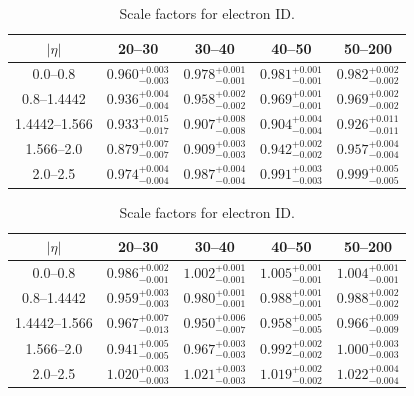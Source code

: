 \begin{table}[h]
\centering
{}
\begin{center}
    \begin{tabular}{@{}c c c c c@{}}
    \toprule
	$|\eta|$                 & 20--30 \GeV               & 30--40 \GeV               & 40--50 \GeV               & 50--200 \GeV \\
    \midrule
	\numrange{0.0}{0.8}      & $0.960_{-0.003}^{+0.003}$ & $0.978_{-0.001}^{+0.001}$ & $0.981_{-0.001}^{+0.001}$ & $0.982_{-0.002}^{+0.002}$ \\
	\numrange{0.8}{1.4442}   & $0.936_{-0.004}^{+0.004}$ & $0.958_{-0.002}^{+0.002}$ & $0.969_{-0.001}^{+0.001}$ & $0.969_{-0.002}^{+0.002}$ \\
	\numrange{1.4442}{1.566} & $0.933_{-0.017}^{+0.015}$ & $0.907_{-0.008}^{+0.008}$ & $0.904_{-0.004}^{+0.004}$ & $0.926_{-0.011}^{+0.011}$ \\
	\numrange{1.566}{2.0}    & $0.879_{-0.007}^{+0.007}$ & $0.909_{-0.003}^{+0.003}$ & $0.942_{-0.002}^{+0.002}$ & $0.957_{-0.004}^{+0.004}$ \\
	\numrange{2.0}{2.5}      & $0.974_{-0.004}^{+0.004}$ & $0.987_{-0.004}^{+0.004}$ & $0.991_{-0.003}^{+0.003}$ & $0.999_{-0.005}^{+0.005}$ \\
    \bottomrule
    \end{tabular}
\end{center}
\caption{
    Scale factors for \EGTIGHT electron ID.
}
\label{table:tight_scale_factor}
\end{table}

\begin{table}[h]
\centering
{}
\begin{center}
    \begin{tabular}{@{}c c c c c@{}}
    \toprule
	$|\eta|$                 & 20--30 \GeV               & 30--40 \GeV               & 40--50 \GeV               & 50--200 \GeV \\
    \midrule
	\numrange{0.0}{0.8}      & $0.986_{-0.001}^{+0.002}$ & $1.002_{-0.001}^{+0.001}$ & $1.005_{-0.001}^{+0.001}$ & $1.004_{-0.001}^{+0.001}$ \\
	\numrange{0.8}{1.4442}   & $0.959_{-0.003}^{+0.003}$ & $0.980_{-0.001}^{+0.001}$ & $0.988_{-0.001}^{+0.001}$ & $0.988_{-0.002}^{+0.002}$ \\
	\numrange{1.4442}{1.566} & $0.967_{-0.013}^{+0.007}$ & $0.950_{-0.007}^{+0.006}$ & $0.958_{-0.005}^{+0.005}$ & $0.966_{-0.009}^{+0.009}$ \\
	\numrange{1.566}{2.0}    & $0.941_{-0.005}^{+0.005}$ & $0.967_{-0.003}^{+0.003}$ & $0.992_{-0.002}^{+0.002}$ & $1.000_{-0.003}^{+0.003}$ \\
	\numrange{2.0}{2.5}      & $1.020_{-0.003}^{+0.003}$ & $1.021_{-0.003}^{+0.003}$ & $1.019_{-0.002}^{+0.002}$ & $1.022_{-0.004}^{+0.004}$ \\
    \bottomrule
    \end{tabular}
\end{center}
\caption{
    Scale factors for \EGMEDIUM electron ID.
}
\label{table:medium_scale_factor}
\end{table}

